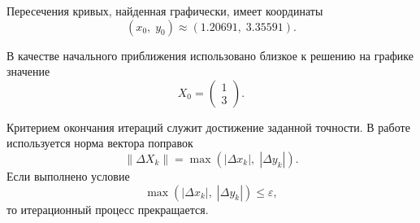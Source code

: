 Пересечения кривых, найденная графически, имеет координаты
\[
(x_0,\;y_0)\approx(1.20691,\;3.35591).
\]

В качестве начального приближения использовано близкое к решению на графике значение
\[
    X_0=
    \begin{pmatrix}
        1 \\
        3
    \end{pmatrix}.
\]

Критерием окончания итераций служит достижение заданной точности. В работе используется норма вектора поправок
\[
    \|\Delta X_k\|=\max\left(|\Delta x_k|,\;|\Delta y_k|\right).
\]
Если выполнено условие
\[
    \max\left(|\Delta x_k|,\;|\Delta y_k|\right)\leq \varepsilon,
\]
то итерационный процесс прекращается.